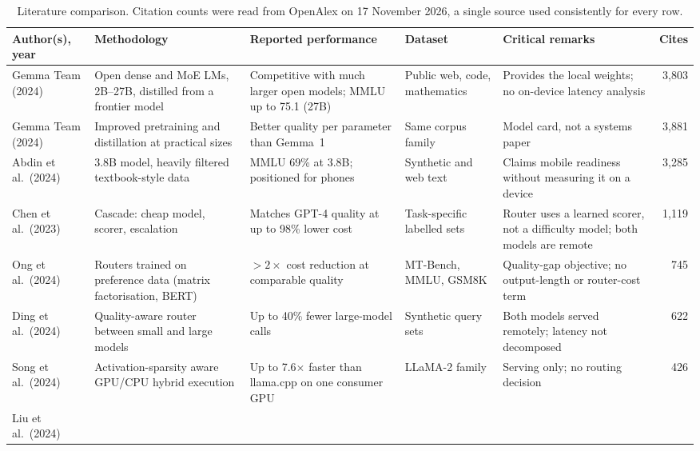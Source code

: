 \documentclass[11pt,a4paper]{article}
\begin{document}
\begin{table}[!htbp]
\centering
\footnotesize
\caption{Literature comparison. Citation counts were read from OpenAlex on
17 November 2026, a single source used consistently for every row.}
\label{tab:lit}
\setlength{\tabcolsep}{4pt}
\begin{tabular}{@{}>{\raggedright\arraybackslash}p{1.9cm}>{\raggedright\arraybackslash}p{3.55cm}>{\raggedright\arraybackslash}p{3.35cm}>{\raggedright\arraybackslash}p{2.35cm}>{\raggedright\arraybackslash}p{2.9cm}r@{}}
\toprule
Author(s), year & Methodology & Reported performance & Dataset & Critical remarks & Cites \\
\midrule
Gemma Team (2024) \cite{gemma} &
Open dense and MoE LMs, 2B--27B, distilled from a frontier model &
Competitive with much larger open models; MMLU up to 75.1 (27B) &
Public web, code, mathematics &
Provides the local weights; no on-device latency analysis & 3{,}803 \\
Gemma Team (2024) \cite{gemma2} &
Improved pretraining and distillation at practical sizes &
Better quality per parameter than Gemma~1 &
Same corpus family &
Model card, not a systems paper & 3{,}881 \\
Abdin et al.\ (2024) \cite{phi3} &
3.8B model, heavily filtered textbook-style data &
MMLU 69\% at 3.8B; positioned for phones &
Synthetic and web text &
Claims mobile readiness without measuring it on a device & 3{,}285 \\
Chen et al.\ (2023) \cite{frugalgpt} &
Cascade: cheap model, scorer, escalation &
Matches GPT-4 quality at up to 98\% lower cost &
Task-specific labelled sets &
Router uses a learned scorer, not a difficulty model; both models are remote & 1{,}119 \\
Ong et al.\ (2024) \cite{routellm} &
Routers trained on preference data (matrix factorisation, BERT) &
${>}2\times$ cost reduction at comparable quality &
MT-Bench, MMLU, GSM8K &
Quality-gap objective; no output-length or router-cost term & 745 \\
Ding et al.\ (2024) \cite{hybridllm} &
Quality-aware router between small and large models &
Up to 40\% fewer large-model calls &
Synthetic query sets &
Both models served remotely; latency not decomposed & 622 \\
Song et al.\ (2024) \cite{powerinfer} &
Activation-sparsity aware GPU/CPU hybrid execution &
Up to 7.6$\times$ faster than llama.cpp on one consumer GPU &
LLaMA-2 family &
Serving only; no routing decision & 426 \\
Liu et al.\ (2024) \cite{mobilellm} &

\end{tabular}
\end{table}
\end{document}
